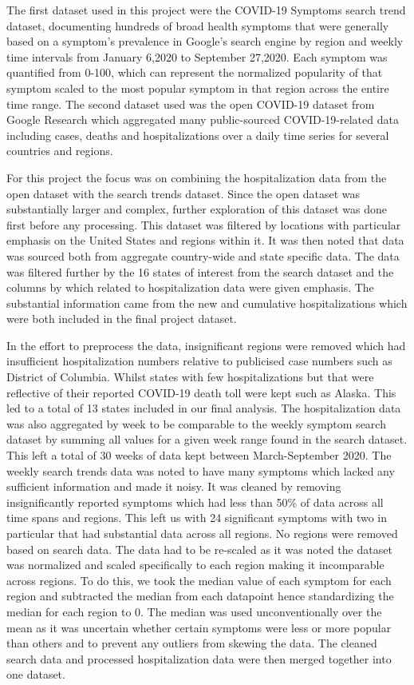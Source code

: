 \documentclass[paper=a4, fontsize=11pt]{scrartcl}
\numberwithin{equation}{section}		%
\numberwithin{figure}{section}			%
\numberwithin{table}{section}				%
\begin{document}
The first dataset used in this project were the COVID-19 Symptoms search trend dataset, documenting hundreds of broad health symptoms that were generally based on a symptom's prevalence in Google’s search engine by region and weekly time intervals from January 6,2020 to September 27,2020. Each symptom was quantified from 0-100, which can represent the normalized popularity of that symptom scaled to the most popular symptom in that region across the entire time range. The second dataset used was the open COVID-19 dataset from Google Research which aggregated many public-sourced COVID-19-related data including cases, deaths and hospitalizations over a daily time series for several countries and regions. 

For this project the focus was on combining the hospitalization data from the open dataset with the search trends dataset. Since the open dataset was substantially larger and complex, further exploration of this dataset was done first before any processing. This dataset was filtered by locations with particular emphasis on the United States and regions within it. It was then noted that data was sourced both from aggregate country-wide and state specific data. The data was filtered further by the 16 states of interest from the search dataset and the columns by which related to hospitalization data were given emphasis. The substantial information came from the new and cumulative hospitalizations which were both included in the final project dataset.

In the effort to preprocess the data, insignificant regions were removed which had insufficient hospitalization numbers relative to publicised case numbers such as District of Columbia. Whilst states with few hospitalizations but that were reflective of their reported COVID-19 death toll were kept such as Alaska. This led to a total of 13 states included in our final analysis. The hospitalization data was also aggregated by week to be comparable to the weekly symptom search dataset by summing all values for a given week range found in the search dataset. This left a total of 30 weeks of data kept between March-September 2020. The weekly search trends data was noted to have many symptoms which lacked any sufficient information and made it noisy. It was cleaned by removing insignificantly reported symptoms which had less than 50\% of data across all time spans and regions. This left us with 24 significant symptoms with two in particular that had substantial data across all regions. No regions were removed based on search data. The data had to be re-scaled as it was noted the dataset was normalized and scaled specifically to each region making it incomparable across regions. To do this, we took the median value of each symptom for each region and subtracted the median from each datapoint hence standardizing the median for each region to 0.  The median was used unconventionally over the mean as it was uncertain whether certain symptoms were less or more popular than others and to prevent any outliers from skewing the data. 
The cleaned search data and processed hospitalization data were then merged together into one dataset.
\end{document}
